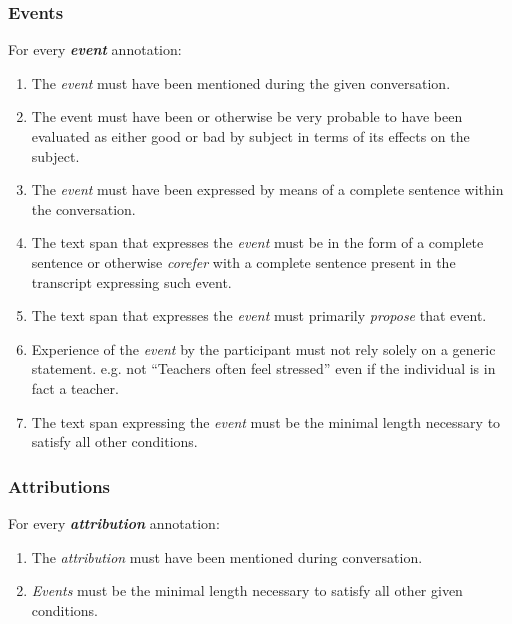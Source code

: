 \documentclass[a4paper,12pt]{article}
\begin{document}
    \subsubsection{Events}
    For every \textbf{\emph{event}} annotation:
        \begin{enumerate}
            \item The \emph{event} must have been mentioned during the given conversation.
            \item The event must have been or otherwise be very probable to have been evaluated as either good or bad by subject in terms of its effects on the subject.
            \item The \emph{event} must have been expressed by means of a complete sentence within the conversation.
            \item The text span that expresses the \emph{event} must be in the form of a complete sentence or otherwise \emph{corefer} with a complete sentence present in the transcript expressing such event.
            \item The text span that expresses the \emph{event} must primarily \emph{propose} that event. %
            \item Experience of the \emph{event} by the participant must not rely solely on a generic statement.
                e.g. not ``Teachers often feel stressed'' even if the individual is in fact a teacher.
            \item The text span expressing the \emph{event} must be the minimal length necessary to satisfy all other conditions.
        \end{enumerate}


    \subsubsection{Attributions}
    For every \textbf{\emph{attribution}} annotation:
        \begin{enumerate}
            \item The \emph{attribution} must have been mentioned during conversation.
            \item \emph{Events} must be the minimal length necessary to satisfy all other given conditions.
        \end{enumerate}
\end{document}
